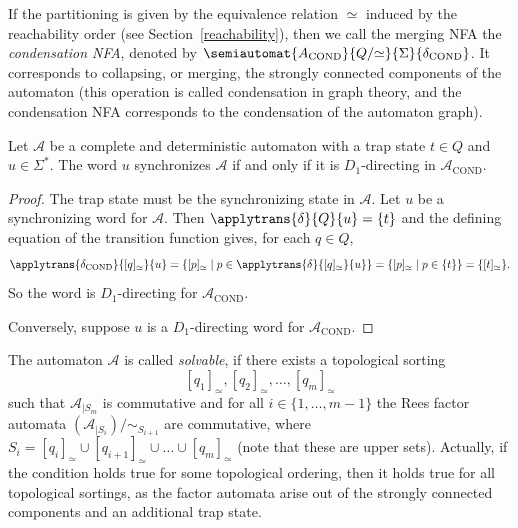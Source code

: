 If the partitioning is given by the equivalence relation $\simeq$
induced by the reachability order (see Section~\ref{reachability}),
then we call the merging NFA the \emph{condensation NFA}, denoted by 
$\semiautomat{A_{\text{COND}}}{Q/{\simeq}}{\Sigma}{\delta_{\text{COND}}}$.
It corresponds to collapsing, or merging, the strongly connected
components of the automaton (this operation is called condensation
in graph theory, and the condensation NFA corresponds to the condensation
of the automaton graph).

\begin{proposition} 
 Let $\mathcal A$ be a complete and deterministic automaton with a trap state $t \in Q$ and $u \in \Sigma^*$.
 The word $u$ synchronizes $\mathcal A$
 if and only if it is $D_1$-directing in $\mathcal A_{\text{COND}}$.
\end{proposition}
\begin{proof}
 The trap state must be the synchronizing state in $\mathcal A$.
 Let $u$ be a synchronizing word for $\mathcal A$.
 Then $\applytrans{\delta}{Q}{u} = \{t\}$ and 
 the defining equation of the transition function 
 gives, for each $q \in Q$,
 \[ 
  \applytrans{\delta_{\text{COND}}}{[q]_{\simeq}}{u}
  = \{ [p]_{\simeq} \mid p \in \applytrans{\delta}{[q]_{\simeq}}{u} \} 
  = \{ [p]_{\simeq} \mid p \in \{ t \} \}
  = \{ [t]_{\simeq} \}.
 \]
 So the word is $D_1$-directing for $\mathcal A_{\text{COND}}$.
 
 Conversely, suppose $u$ is a $D_1$-directing word for $\mathcal A_{\text{COND}}$.
 
 
\end{proof}





The automaton $\mathcal A$ is called \emph{solvable}, if
there exists a topological sorting 
\[ 
[q_1]_{\simeq}, [q_2]_{\simeq},
\ldots, [q_m]_{\simeq}
\] such that $\mathcal A_{|S_m}$
is commutative and for all $i \in \{1,\ldots,m-1\}$
the Rees factor automata $( \mathcal A_{|S_i} ) / {\sim_{S_{i+1}}}$
are commutative,
where $S_i = [q_i]_{\simeq} \cup [q_{i+1}]_{\simeq} \cup \ldots \cup [q_m]_{\simeq}$ 
(note that these are upper sets).
Actually, if the condition holds true for some topological ordering,
then it holds true for all topological sortings, as
the factor automata arise out of the strongly connected components
and an additional trap state.

